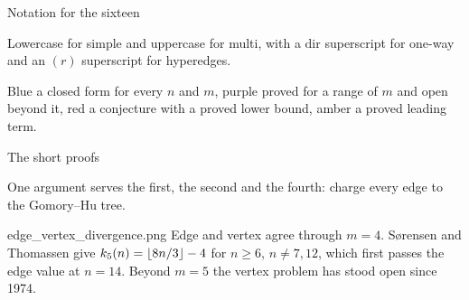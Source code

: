 \documentclass[aspectratio=1610,11pt]{beamer}
\begin{document}
\begin{frame}{Notation for the sixteen}
\vfill
\centering
{}

\vspace{14pt}
{\footnotesize\color{black!60} Lowercase for simple and uppercase for multi, with a $\mathrm{dir}$ superscript for one-way and an $(r)$ superscript for hyperedges.}
\vfill
\end{frame}

  {\figvarianttree}
  {Blue a closed form for every $n$ and $m$, purple proved for a range of $m$ and open beyond it, red a conjecture with a proved lower bound, amber a proved leading term.}


\begin{frame}{The short proofs}
\vfill
\centering
\renewcommand{\arraystretch}{1.7}
\small
{}

\vspace{18pt}
{\footnotesize\color{black!60} One argument serves the first, the second and the fourth: charge every edge to the Gomory--Hu tree.}
\vfill
\end{frame}

  {edge_vertex_divergence.png}
  {Edge and vertex agree through $m=4$. S{\o}rensen and Thomassen give $k_5(n)=\left\lfloor 8n/3\right\rfloor-4$ for $n\ge6$, $n\ne7,12$, which first passes the edge value at $n=14$. Beyond $m=5$ the vertex problem has stood open since 1974.}
\end{document}
